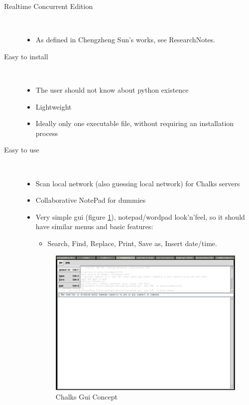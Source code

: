 \documentclass{report}
\begin{document}
\begin{description}

\item [Realtime Concurrent Edition] \hspace{0cm} \\
    \begin{itemize}
    \item As defined in Chengzheng Sun's works, see ResearchNotes.
    \end{itemize}
    
\item [Easy to install] \hspace{0cm} \\
    \begin{itemize}
    \item The user should not know about python existence
    \item Lightweight
    \item Ideally only one executable file, without requiring an installation process
    \end{itemize}
    
\item [Easy to use] \hspace{0cm} \\
    \begin{itemize}
    \item Scan local network (also guessing local network) for Chalks servers
    \item Collaborative NotePad for dummies
    \item Very simple gui (figure \ref{fig:chalksguiconcept}), notepad/wordpad look'n'feel, so it should have similar menus and basic features:
      \begin{itemize}
      \item Search, Find, Replace, Print, Save as, Insert date/time.
      \end{itemize}

\begin{figure}[htbp]
 \begin{center}
    \includegraphics[angle=0,width=0.5\linewidth]{schemas/chalks_gui_concept.png}
 \end{center}
 \caption{Chalks Gui Concept}
  \label{fig:chalksguiconcept}
\end{figure}
      

\end{itemize}
\end{description}
\end{document}
